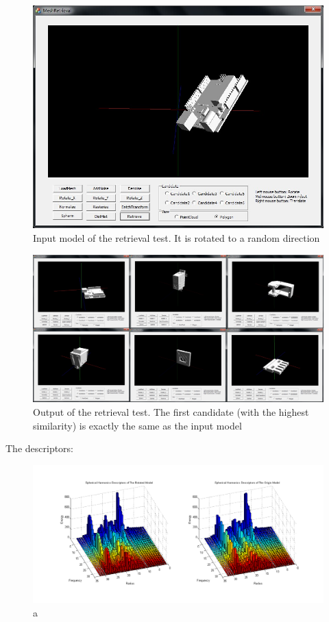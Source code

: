 \begin{enumerate}
\begin{figure}[h]
\centering
\includegraphics[width=0.7\linewidth]{input_rotationinvariant_test32}
\caption{Input model of the retrieval test. It is rotated to a random direction} \label{input_rotationinvariant_test32}
\end{figure}

\begin{figure}[h]
\centering
\includegraphics[width=0.7\linewidth]{output_rotationinvariant_test32}
\caption{Output of the retrieval test. The first candidate (with the highest similarity) is exactly the same as the input model} \label{output_rotationinvariant_test32}
\end{figure}

The descriptors:

\begin{figure}[h]
\centering
\includegraphics[width=0.7\linewidth]{rotationinvariant_test_SH10}
\caption{a} \label{rotationinvariant_test_SH10}
\end{figure}


\end{enumerate}
